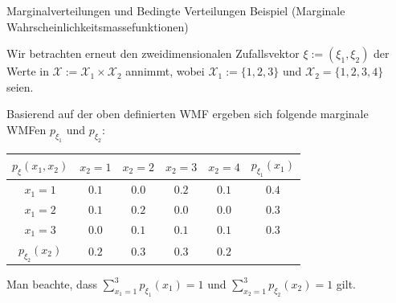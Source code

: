 \documentclass[
  8pt,
  ignorenonframetext,
]{beamer}
\begin{document}
\begin{frame}{Marginalverteilungen und Bedingte Verteilungen}
\protect\hypertarget{marginalverteilungen-und-bedingte-verteilungen-2}{}
Beispiel (Marginale Wahrscheinlichkeitsmassefunktionen)

\vspace{2mm}

\small
\justifying

Wir betrachten erneut den zweidimensionalen Zufallsvektor
\(\xi:= (\xi_1,\xi_2)\) der Werte in
\(\mathcal{X} := \mathcal{X}_1 \times \mathcal{X}_2\) annimmt, wobei
\(\mathcal{X}_1 := \{1,2,3\}\) und \(\mathcal{X}_2 = \{1,2,3,4\}\)
seien. \vspace{1mm}

Basierend auf der oben definierten WMF ergeben sich folgende marginale
WMFen \(p_{\xi_1}\) und \(p_{\xi_2}\): \vspace{2mm}

\begin{table}\label{tab:wmf_marginal}
\begin{center}
\begin{tabular}{|c|cccc|c|}
\hline
$p_\xi(x_1,x_2)$    &   $x_2 = 1$   &   $x_2 = 2$   &   $x_2 = 3$   &   $x_2 = 4$   & $p_{\xi_1}(x_1)$  \\\hline
$x_1 = 1$           &   $0.1$       &   $0.0$       &   $0.2$       &   $0.1$       & $0.4$             \\
$x_1 = 2$           &   $0.1$       &   $0.2$       &   $0.0$       &   $0.0$       & $0.3$             \\
$x_1 = 3$           &   $0.0$       &   $0.1$       &   $0.1$       &   $0.1$       & $0.3$             \\\hline
$p_{\xi_2}(x_2)$    &   $0.2$       &   $0.3$       &   $0.3$       &   $0.2$       &                   \\\hline
\end{tabular}
\end{center}
\end{table}
\vspace{2mm}

Man beachte, dass \(\sum_{x_1 = 1}^3 p_{\xi_1}(x_1) = 1\) und
\(\sum_{x_2 = 1}^3 p_{\xi_2}(x_2) = 1\) gilt.
\end{frame}
\end{document}
